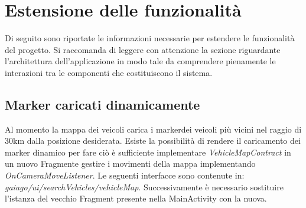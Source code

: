 \section{Estensione delle funzionalità}
Di seguito sono riportate le informazioni necessarie per estendere le funzionalità del progetto. Si raccomanda di leggere con attenzione la sezione riguardante l'architettura dell'applicazione in modo tale da comprendere pienamente le interazioni tra le componenti che costituiscono il sistema.
\subsection{Marker caricati dinamicamente}
Al momento la mappa dei veicoli carica i marker\glosp dei veicoli più vicini nel raggio di 30km dalla posizione desiderata. Esiste la possibilità di rendere il caricamento dei marker dinamico per fare ciò è sufficiente implementare \textit{VehicleMapContract} in un nuovo Fragment\glosp e gestire i movimenti della mappa implementando \textit{OnCameraMoveListener}.
Le seguenti interfacce sono contenute in:
\textit{gaiago/ui/searchVehicles/vehicleMap}.
Successivamente è necessario sostituire l'istanza del vecchio Fragment presente nella MainActivity con la nuova.